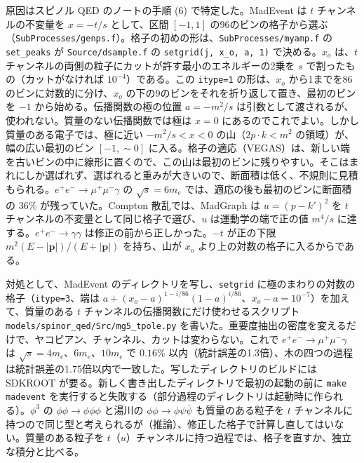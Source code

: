 \documentclass[a4paper,10pt]{ltjsarticle}
\begin{document}
原因はスピノル QED のノートの手順 (6) で特定した。MadEvent は $t$ チャンネルの不変量を $x=-t/s$ として、区間 $[-1,1]$ の96のビンの格子から選ぶ（\texttt{SubProcesses/genps.f}）。格子の初めの形は、\texttt{SubProcesses/myamp.f} の \texttt{set\_peaks} が \texttt{Source/dsample.f} の \texttt{setgrid(j, x\_o, a, 1)} で決める。$x_o$ は、$t$ チャンネルの両側の粒子にカットが許す最小のエネルギーの2乗を $s$ で割ったもの（カットがなければ $10^{-4}$）である。この \texttt{itype=1} の形は、$x_o$ から1までを86のビンに対数的に分け、$x_o$ の下の9のビンをそれを折り返して置き、最初のビンを $-1$ から始める。伝播関数の極の位置 $a=-m^2/s$ は引数として渡されるが、使われない。質量のない伝播関数では極は $x=0$ にあるのでこれでよい。しかし質量のある電子では、極に近い $-m^2/s<x<0$ の山（$2p\cdot k<m^2$ の領域）が、幅の広い最初のビン $[-1,\sim0]$ に入る。格子の適応（VEGAS）は、新しい端を古いビンの中に線形に置くので、この山は最初のビンに残りやすい。そこはまれにしか選ばれず、選ばれると重みが大きいので、断面積は低く、不規則に見積もられる。$e^+e^-\to\mu^+\mu^-\gamma$ の $\sqrt s=6m_e$ では、適応の後も最初のビンに断面積の $36\%$ が残っていた。Compton 散乱では、MadGraph は $u=(p-k')^2$ を $t$ チャンネルの不変量として同じ格子で選び、$u$ は運動学の端で正の値 $m^4/s$ に達する。$e^+e^-\to\gamma\gamma$ は修正の前から正しかった。$-t$ が正の下限 $m^2(E-|\boldsymbol p|)/(E+|\boldsymbol p|)$ を持ち、山が $x_o$ より上の対数の格子に入るからである。

対処として、MadEvent のディレクトリを写し、\texttt{setgrid} に極のまわりの対数の格子（\texttt{itype=3}、端は $a+(x_o-a)^{1-i/86}(1-a)^{i/86}$、$x_o-a=10^{-7}$）を加えて、質量のある $t$ チャンネルの伝播関数にだけ使わせるスクリプト \nolinkurl{models/spinor_qed/Src/mg5_tpole.py} を書いた。重要度抽出の密度を変えるだけで、ヤコビアン、チャンネル、カットは変わらない。これで $e^+e^-\to\mu^+\mu^-\gamma$ は $\sqrt s=4m_e$、$6m_e$、$10m_e$ で $0.16\%$ 以内（統計誤差の1.3倍）、木の四つの過程は統計誤差の1.75倍以内で一致した。写したディレクトリのビルドには SDKROOT が要る。新しく書き出したディレクトリで最初の起動の前に \texttt{make madevent} を実行すると失敗する（部分過程のディレクトリは起動時に作られる）。$\phi^3$ の $\phi\phi\to\phi\phi\phi$ と湯川の $\phi\phi\to\phi\psi\bar\psi$ も質量のある粒子を $t$ チャンネルに持つので同じ型と考えられるが（推論）、修正した格子で計算し直してはいない。質量のある粒子を $t$（$u$）チャンネルに持つ過程では、格子を直すか、独立な積分と比べる。
\end{document}

